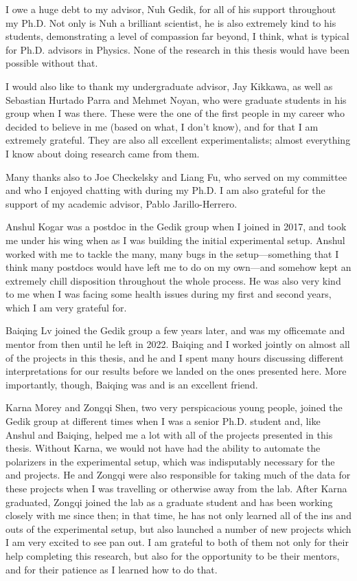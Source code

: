 I owe a huge debt to my advisor, Nuh Gedik, for all of his support throughout my Ph.D.
Not only is Nuh a brilliant scientist, he is also extremely kind to his students, demonstrating a level of compassion far beyond, I think, what is typical for Ph.D. advisors in Physics.
None of the research in this thesis would have been possible without that.

I would also like to thank my undergraduate advisor, Jay Kikkawa, as well as Sebastian Hurtado Parra and Mehmet Noyan, who were graduate students in his group when I was there.
These were the one of the first people in my career who decided to believe in me (based on what, I don't know), and for that I am extremely grateful.
They are also all excellent experimentalists; almost everything I know about doing research came from them.

Many thanks also to Joe Checkelsky and Liang Fu, who served on my committee and who I enjoyed chatting with during my Ph.D.
I am also grateful for the support of my academic advisor, Pablo Jarillo-Herrero.

Anshul Kogar was a postdoc in the Gedik group when I joined in \num{2017}, and took me under his wing when as I was building the initial experimental setup.
Anshul worked with me to tackle the many, many bugs in the setup---something that I think many postdocs would have left me to do on my own---and somehow kept an extremely chill disposition throughout the whole process.
He was also very kind to me when I was facing some health issues during my first and second years, which I am very grateful for.

Baiqing Lv joined the Gedik group a few years later, and was my officemate and mentor from then until he left in \num{2022}.
Baiqing and I worked jointly on almost all of the projects in this thesis, and he and I spent many hours discussing different interpretations for our results before we landed on the ones presented here.
More importantly, though, Baiqing was and is an excellent friend.

Karna Morey and Zongqi Shen, two very perspicacious young people, joined the Gedik group at different times when I was a senior Ph.D. student and, like Anshul and Baiqing, helped me a lot with all of the projects presented in this thesis.
Without Karna, we would not have had the ability to automate the polarizers in the experimental setup, which was indisputably necessary for the  and  projects.
He and Zongqi were also responsible for taking much of the data for these projects when I was travelling or otherwise away from the lab.
After Karna graduated, Zongqi joined the lab as a graduate student and has been working closely with me since then; in that time, he has not only learned all of the ins and outs of the experimental setup, but also launched a number of new projects which I am very excited to see pan out.
I am grateful to both of them not only for their help completing this research, but also for the opportunity to be their mentors, and for their patience as I learned how to do that.

